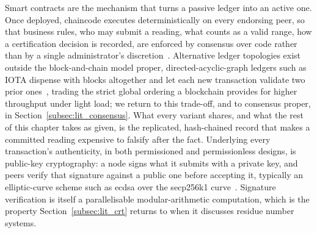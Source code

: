Smart contracts are the mechanism that turns a passive ledger into an
active one. Once deployed, chaincode executes deterministically on every
endorsing peer, so that business rules, who may submit a reading, what
counts as a valid range, how a certification decision is recorded, are
enforced by consensus over code rather than by a single administrator's
discretion~\cite{krstic2020hyperledgerframeworks, tang2025applicationsblockchain}.
Alternative ledger topologies exist outside the block-and-chain model
proper, directed-acyclic-graph ledgers such as IOTA dispense with blocks
altogether and let each new transaction validate two prior
ones~\cite{anonndimprovedblockchain}, trading the strict global ordering a
blockchain provides for higher throughput under light load; we return to
this trade-off, and to consensus proper, in
Section~\ref{subsec:lit_consensus}. What every variant shares, and what
the rest of this chapter takes as given, is the replicated, hash-chained
record that makes a committed reading expensive to falsify after the fact.
Underlying every transaction's authenticity, in both permissioned and
permissionless designs, is public-key cryptography: a node signs what it
submits with a private key, and peers verify that signature against a
public one before accepting it, typically an elliptic-curve scheme such as
\gls{ecdsa} over the secp256k1 curve~\cite{anon2024securitysecp}. Signature
verification is itself a parallelisable modular-arithmetic computation,
which is the property Section~\ref{subsec:lit_crt} returns to when it
discusses residue number systems.

\label{subsec:lit_precision_ag}

